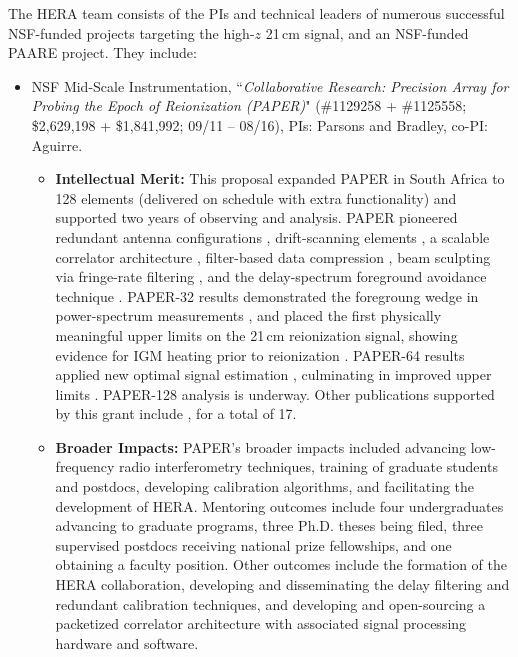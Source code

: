 \documentclass[preprint,11pt]{aastex}
\newcommand{\Mycitet}[1]{\citet{#1}}
\newcommand{\Mycitep}[1]{\citep{#1}}
\begin{document}
\noindent The HERA team consists of the PIs and technical leaders of numerous successful NSF-funded projects targeting the high-$z$ 21\,cm signal, and an NSF-funded PAARE project. They include:
\begin{itemize}[noitemsep,nolistsep,leftmargin=11pt]
\item NSF Mid-Scale Instrumentation, ``{\it Collaborative Research: Precision Array for Probing the Epoch of Reionization (PAPER)}" 
(\#1129258 + \#1125558; \$2,629,198 + \$1,841,992; 09/11 -- 08/16), PIs: Parsons and Bradley, co-PI: Aguirre.
\begin{itemize}[noitemsep,nolistsep,leftmargin=11pt]
\item{\bf Intellectual Merit:}
This proposal expanded PAPER in South Africa to 128 elements (delivered on schedule with extra
functionality) and supported two years of observing and analysis.
PAPER pioneered redundant antenna configurations \Mycitep{parsons_et_al2012a},
 drift-scanning elements \Mycitep{parsons_et_al2010},
a scalable correlator architecture \Mycitep{parsons_et_al2008,parsons_et_al2006},
filter-based data compression \Mycitep{parsons_backer2009,parsons_et_al2014},
beam sculpting via fringe-rate filtering \Mycitep{parsons_et_al2015},
and the delay-spectrum foreground avoidance technique \Mycitep{parsons_et_al2012b}.
PAPER-32 results demonstrated the foregroung wedge in power-spectrum measurements
\Mycitep{pober_et_al2013b}, and placed the first physically meaningful upper limits on the 21\,cm reionization signal, showing
evidence for IGM heating prior to reionization \Mycitep{parsons_et_al2014}.  PAPER-64 results applied new optimal signal
estimation \Mycitep{liu_et_al2014a,liu_et_al2014b}, culminating
in improved upper limits \Mycitep{ali_et_al2015,pober_et_al2015}.  
PAPER-128 analysis is
underway.  Other publications supported by this grant include \Mycitet{liu_parsons2015, liu_et_al2015,moore_et_al2016,
jacobs_et_al2013,moore_et_al2013,stefan_et_al2013,
pober_et_al2012}, for a total of 17.
\item{\bf Broader Impacts:}
PAPER's broader impacts included advancing low-frequency radio interferometry techniques, 
training of graduate students and postdocs, developing calibration algorithms, and facilitating the development of HERA. 
Mentoring outcomes include four undergraduates advancing to graduate programs, three Ph.D. theses being filed, 
three supervised postdocs receiving national prize fellowships, and
one obtaining a faculty position.  Other outcomes include the formation of the HERA collaboration, developing and
disseminating the delay filtering and redundant calibration techniques, and developing and open-sourcing
a packetized correlator architecture with associated signal processing hardware and software.
\end{itemize}
 

\end{itemize}
\end{document}
